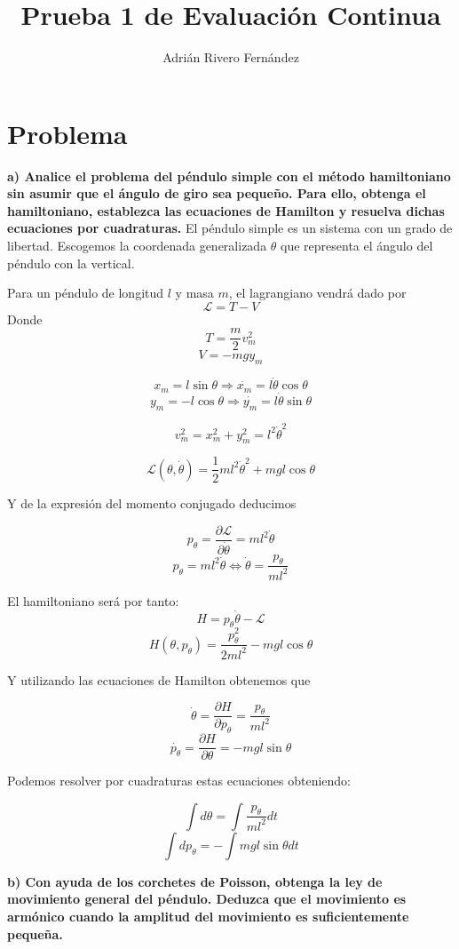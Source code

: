 \documentclass[a4paper,12pt,spanish]{article}
\newcommand{\address}[1]{
\par {\raggedright #1
\vspace{1.4em}
\noindent\par}
}
\begin{document}
\title{Prueba 1 de Evaluación Continua}
\author{Adrián Rivero Fernández}
\date{}


\maketitle




\section*{Problema}
\textbf{a) Analice el problema del péndulo simple con el método hamiltoniano sin
asumir que el ángulo de giro sea pequeño. Para ello, obtenga el hamiltoniano,
establezca las ecuaciones de Hamilton y resuelva dichas ecuaciones por
cuadraturas.
}
\vspace{\baselineskip}
El péndulo simple es un sistema con un grado de libertad. Escogemos la coordenada generalizada $\theta$ que representa el ángulo del péndulo con la vertical. 

Para un péndulo de longitud $l$ y masa $m$, el lagrangiano vendrá dado por 
\[ \mathcal{L} = T - V
\]
Donde 
\[T = \frac{m}{2} v_m^2\]
\[V = - mgy_m\]

\[x_m = l\sin \theta \Longrightarrow \dot{x_m}=l\dot{\theta}\cos\theta
\]
\[y_m = -l\cos\theta \Longrightarrow \dot{y_m} = l\dot{\theta}\sin\theta
\]

\[v_m^2 = x_m^2+y_m^2 = l^2\dot{\theta}^2
\]


\[ \mathcal{L}(\theta,\dot{\theta}) = \frac{1}{2}ml^2\dot{\theta}^2 + mgl\cos\theta
\]

Y de la expresión del momento conjugado deducimos

\[p_\theta = \frac{\partial\mathcal{L}}{\partial \dot{\theta}} 
= 
ml^2\dot{\theta}
\]
\[p_\theta = ml^2\dot{\theta}  \Longleftrightarrow  
\dot{\theta} = \frac{p_\theta}{ml^2}  \]

El hamiltoniano será por tanto:
\[ H = p_\theta \dot{\theta} - \mathcal{L}
\]
\[ H(\theta,p_\theta) = \frac{p_\theta^2}{2ml^2} - mgl\cos\theta
\]

Y utilizando las ecuaciones de Hamilton obtenemos que

\[\dot{\theta} = \frac{\partial H }{\partial p_\theta } = 
\frac{p_\theta}{ml^2}
\]
\[\dot{p_\theta} =  \frac{\partial H }{\partial \theta }=
-mgl\sin\theta
\]

Podemos resolver por cuadraturas estas ecuaciones obteniendo:

\[ \int  d\theta = \int \frac{p_\theta}{ml^2} dt 
\]
\[ \int dp_\theta = -\int mgl\sin\theta dt
\]


\vspace{\baselineskip}
\textbf{b) Con ayuda de los corchetes de Poisson, obtenga la ley de movimiento
	general del péndulo. Deduzca que el movimiento es armónico cuando la
	amplitud del movimiento es suficientemente pequeña.
}
\end{document}
